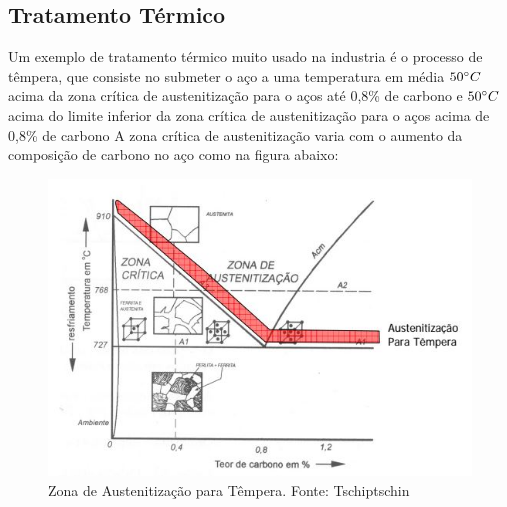 \subsection{Tratamento Térmico}
Um exemplo de tratamento térmico muito usado na industria é o processo de têmpera, que consiste no submeter o aço a uma temperatura em média $50 \degree C$ acima da zona crítica de austenitização para o aços até 0,8\% de carbono e $50 \degree C$ acima do limite inferior da zona crítica de austenitização para o aços acima de 0,8\% de carbono A zona crítica de austenitização varia com o aumento da composição de carbono no aço como na figura abaixo:
\begin{figure}[ht]
	\centering
	\label{austenitizacao}
	\includegraphics[keepaspectratio=true,scale=0.8]{figuras/austenitizacao.JPG}
	\caption{Zona de Austenitização para Têmpera. Fonte: Tschiptschin}
\end{figure}

